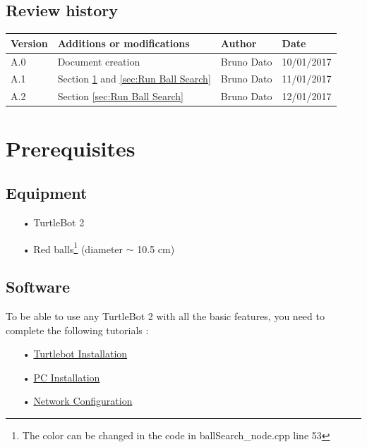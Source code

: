 \documentclass[10pt,a4paper]{article}
\begin{document}
\subsection*{Review history}

\begin{center}
    \begin{tabular}{| l | l | l | l |}
    \hline
     \rowcolor{gray} Version & Additions or modifications & Author & Date \\ \hline
    A.0 & Document creation & Bruno Dato & 10/01/2017\\ \hline
    A.1 & Section \ref{sec:Prerequisites} and \ref{sec:Run Ball Search}  & Bruno Dato & 11/01/2017\\ \hline
    A.2 & Section \ref{sec:Run Ball Search}  & Bruno Dato & 12/01/2017\\ \hline
     
    \end{tabular}
\end{center}

\newpage
\tableofcontents
\newpage
	

\section{Prerequisites}
\label{sec:Prerequisites}

\subsection{Equipment}

\begin{itemize}
\item[•] TurtleBot 2
\item[•] Red balls\footnote{The color can be changed in the code in ballSearch\_node.cpp line 53} (diameter $\sim$ 10.5 cm)
\end{itemize}

\subsection{Software}

To be able to use any TurtleBot 2 with all the basic features, you need to complete the following tutorials :

\begin{itemize}
\item[•] \href{http://wiki.ros.org/turtlebot/Tutorials/indigo/Turtlebot%20Installation}{Turtlebot Installation} 
\item[•] \href{http://wiki.ros.org/turtlebot/Tutorials/indigo/PC%20Installation}{PC Installation} 
\item[•] \href{http://wiki.ros.org/turtlebot/Tutorials/indigo/Network%20Configuration}{Network Configuration} 
\end{itemize}
\end{document}

